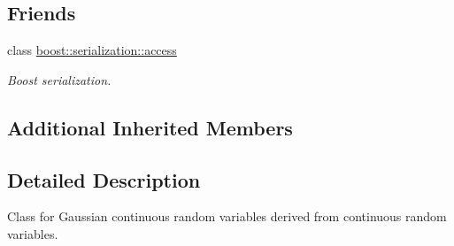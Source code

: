 \subsection*{Friends}
\begin{DoxyCompactItemize}
\item 
class \hyperlink{class_c_gaussian_c_r_v_ac98d07dd8f7b70e16ccb9a01abf56b9c}{boost\-::serialization\-::access}
\begin{DoxyCompactList}\small\item\em Boost serialization. \end{DoxyCompactList}\end{DoxyCompactItemize}
\subsection*{Additional Inherited Members}


\subsection{Detailed Description}
Class for Gaussian continuous random variables derived from continuous random variables. 

